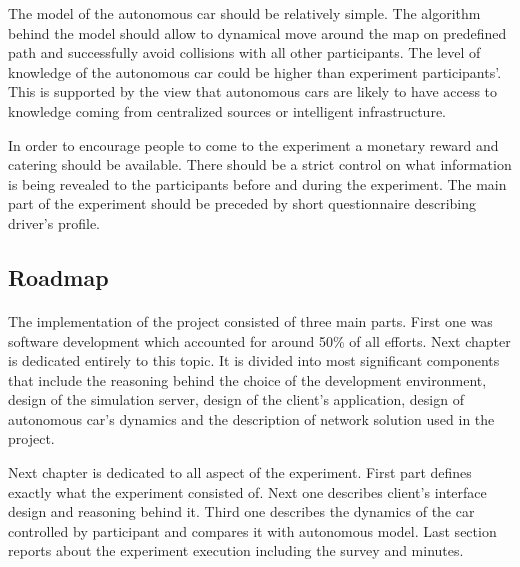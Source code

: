 \documentclass[11pt,english]{article}
\begin{document}
\par
The model of the autonomous car should be relatively simple. The algorithm behind the model should allow to dynamical move around the map on predefined path and successfully avoid collisions with all other participants. The level of knowledge of the autonomous car could be higher than experiment participants'. This is supported by the view that autonomous cars are likely to have access to knowledge coming from centralized sources or intelligent infrastructure.

\par
In order to encourage people to come to the experiment a monetary reward and catering should be available. There should be a strict control on what information is being revealed to the participants before and during the experiment. The main part of the experiment should be preceded by short questionnaire describing driver's profile.

\par









\subsection{Roadmap}

\paragraph{}

The implementation of the project consisted of three main parts. First one was software development which accounted for around 50\% of all efforts. Next chapter is dedicated entirely to this topic. It is divided into most significant components that include the reasoning behind the choice of the development environment, design of the simulation server, design of the client's application, design of autonomous car's dynamics and the description of network solution used in the project. 

\par

Next chapter is dedicated to all aspect of the experiment. First part defines exactly what the experiment consisted of. Next one describes client's interface design and reasoning behind it. Third one describes the dynamics of the car controlled by participant and compares it with autonomous model. Last section reports about the experiment execution including the survey and minutes.
\end{document}
